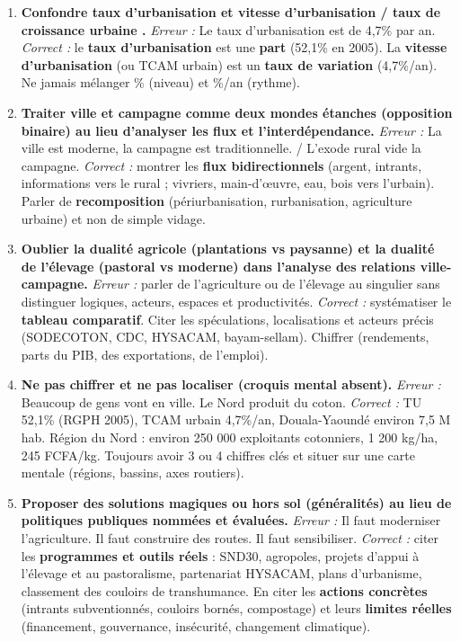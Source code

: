 \documentclass[11pt]{article}
\begin{document}
\begin{attention}
\begin{enumerate}
    \item \textbf{Confondre \og taux d'urbanisation \fg{} et \og vitesse d'urbanisation \fg{} / \og taux de croissance urbaine \fg{}.}
    \emph{Erreur :} \og Le taux d'urbanisation est de 4,7\% par an. \fg{}
    \emph{Correct :} le \textbf{taux d'urbanisation} est une \textbf{part} (52,1\% en 2005). La \textbf{vitesse d'urbanisation} (ou TCAM urbain) est un \textbf{taux de variation} (4,7\%/an). Ne jamais mélanger \% (niveau) et \%/an (rythme).
    \item \textbf{Traiter \og ville \fg{} et \og campagne \fg{} comme deux mondes étanches (opposition binaire) au lieu d'analyser les flux et l'interdépendance.}
    \emph{Erreur :} \og La ville est moderne, la campagne est traditionnelle. \fg{} / \og L'exode rural vide la campagne. \fg{}
    \emph{Correct :} montrer les \textbf{flux bidirectionnels} (argent, intrants, informations vers le rural ; vivriers, main-d'œuvre, eau, bois vers l'urbain). Parler de \textbf{recomposition} (périurbanisation, rurbanisation, agriculture urbaine) et non de simple vidage.
    \item \textbf{Oublier la dualité agricole (plantations vs paysanne) et la dualité de l'élevage (pastoral vs moderne) dans l'analyse des relations ville-campagne.}
    \emph{Erreur :} parler de \og l'agriculture \fg{} ou de \og l'élevage \fg{} au singulier sans distinguer logiques, acteurs, espaces et productivités.
    \emph{Correct :} systématiser le \textbf{tableau comparatif}. Citer les spéculations, localisations et acteurs précis (SODECOTON, CDC, HYSACAM, bayam-sellam). Chiffrer (rendements, parts du PIB, des exportations, de l'emploi).
    \item \textbf{Ne pas chiffrer et ne pas localiser (croquis mental absent).}
    \emph{Erreur :} \og Beaucoup de gens vont en ville. \fg{} \og Le Nord produit du coton. \fg{}
    \emph{Correct :} \og TU 52,1\% (RGPH 2005), TCAM urbain 4,7\%/an, Douala-Yaoundé environ 7,5 M hab. \fg{} \og Région du Nord : environ 250 000 exploitants cotonniers, 1 200 kg/ha, 245 FCFA/kg. \fg{} Toujours avoir 3 ou 4 chiffres clés et situer sur une carte mentale (régions, bassins, axes routiers).
    \item \textbf{Proposer des solutions \og magiques \fg{} ou hors sol (généralités) au lieu de politiques publiques nommées et évaluées.}
    \emph{Erreur :} \og Il faut moderniser l'agriculture. \fg{} \og Il faut construire des routes. \fg{} \og Il faut sensibiliser. \fg{}
    \emph{Correct :} citer les \textbf{programmes et outils réels} : SND30, agropoles, projets d'appui à l'élevage et au pastoralisme, partenariat HYSACAM, plans d'urbanisme, classement des couloirs de transhumance. En citer les \textbf{actions concrètes} (intrants subventionnés, couloirs bornés, compostage) et leurs \textbf{limites réelles} (financement, gouvernance, insécurité, changement climatique).
\end{enumerate}
\end{attention}
\end{document}
